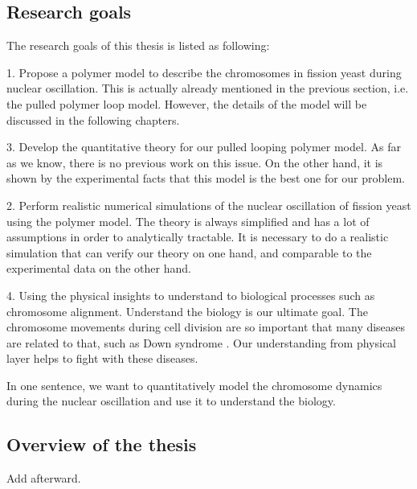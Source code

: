 \subsection{Research goals}
\label{sub:research_goal}

The research goals of this thesis is listed as following:

1. Propose a polymer model to describe the chromosomes in fission yeast during nuclear oscillation. This is actually already mentioned in the previous section, i.e. the pulled polymer loop model. However, the details of the model will be discussed in the following chapters.

3. Develop the quantitative theory for our pulled looping polymer model. As far as we know, there is no previous work on this issue. On the other hand, it is shown by the experimental facts that this model is the best one for our problem. 

2. Perform realistic numerical simulations of the nuclear oscillation of fission yeast using the polymer model. The theory is always simplified and has a lot of assumptions in order to analytically tractable. It is necessary to do a realistic simulation that can verify our theory on one hand, and comparable to the experimental data on the other hand.

4. Using the physical insights to understand to biological processes such as chromosome alignment. Understand the biology is our ultimate goal. The chromosome movements during cell division are so important that many diseases are related to that, such as Down syndrome \cite{Patterson2009}. Our understanding from physical layer helps to fight with these diseases.

In one sentence, we want to quantitatively model the chromosome dynamics during the nuclear oscillation and use it to understand the biology. 

\subsection{Overview of the thesis}
\label{sub:organisation_of_the_thesis}

Add afterward.







